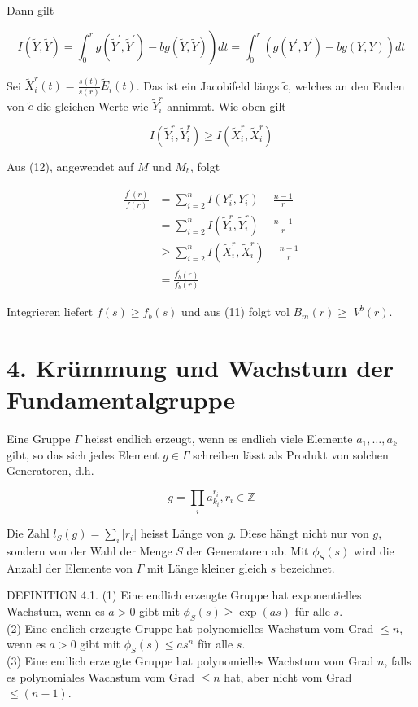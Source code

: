 \documentclass[10pt]{article}
\begin{document}
Dann gilt

$$
\left.I(\tilde{Y}, \tilde{Y})=\int_{0}^{r} g\left(\tilde{Y}^{\prime}, \tilde{Y}^{\prime}\right)-b g(\tilde{Y}, \tilde{Y})\right) d t=\int_{0}^{r}\left(g\left(Y^{\prime}, Y^{\prime}\right)-b g(Y, Y)\right) d t
$$

Sei $\tilde{X}_{i}^{r}(t)=\frac{s(t)}{s(r)} \tilde{E}_{i}(t)$. Das ist ein Jacobifeld längs $\tilde{c}$, welches an den Enden von $\tilde{c}$ die gleichen Werte wie $\tilde{Y}_{i}^{r}$ annimmt. Wie oben gilt

$$
I\left(\tilde{Y}_{i}^{r}, \tilde{Y}_{i}^{r}\right) \geq I\left(\tilde{X}_{i}^{r}, \tilde{X}_{i}^{r}\right)
$$

Aus (12), angewendet auf $M$ und $M_{b}$, folgt

$$
\begin{aligned}
\frac{f^{\prime}(r)}{f(r)} & =\sum_{i=2}^{n} I\left(Y_{i}^{r}, Y_{i}^{r}\right)-\frac{n-1}{r} \\
& =\sum_{i=2}^{n} I\left(\tilde{Y}_{i}^{r}, \tilde{Y}_{i}^{r}\right)-\frac{n-1}{r} \\
& \geq \sum_{i=2}^{n} I\left(\tilde{X}_{i}^{r}, \tilde{X}_{i}^{r}\right)-\frac{n-1}{r} \\
& =\frac{f_{b}^{\prime}(r)}{f_{b}(r)}
\end{aligned}
$$

Integrieren liefert $f(s) \geq f_{b}(s)$ und aus (11) folgt vol $B_{m}(r) \geq$ $V^{b}(r)$.

\section*{4. Krümmung und Wachstum der Fundamentalgruppe}
Eine Gruppe $\Gamma$ heisst endlich erzeugt, wenn es endlich viele Elemente $a_{1}, \ldots, a_{k}$ gibt, so das sich jedes Element $g \in \Gamma$ schreiben lässt als Produkt von solchen Generatoren, d.h.

$$
g=\prod_{i} a_{k_{i}}^{r_{i}}, r_{i} \in \mathbb{Z}
$$

Die Zahl $l_{S}(g)=\sum_{i}\left|r_{i}\right|$ heisst Länge von $g$. Diese hängt nicht nur von $g$, sondern von der Wahl der Menge $S$ der Generatoren ab. Mit $\phi_{S}(s)$ wird die Anzahl der Elemente von $\Gamma$ mit Länge kleiner gleich $s$ bezeichnet.

DEFINITION 4.1. (1) Eine endlich erzeugte Gruppe hat exponentielles Wachstum, wenn es $a>0$ gibt mit $\phi_{S}(s) \geq \exp (a s)$ für alle $s$.\\
(2) Eine endlich erzeugte Gruppe hat polynomielles Wachstum vom Grad $\leq n$, wenn es $a>0$ gibt mit $\phi_{S}(s) \leq a s^{n}$ für alle $s$.\\
(3) Eine endlich erzeugte Gruppe hat polynomielles Wachstum vom Grad $n$, falls es polynomiales Wachstum vom Grad $\leq n$ hat, aber nicht vom Grad $\leq(n-1)$.
\end{document}
